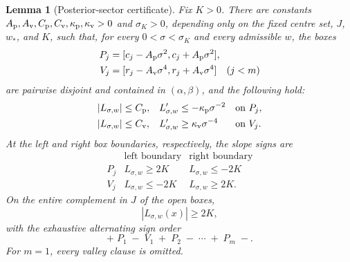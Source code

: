 \documentclass{iopjournal}
\theoremstyle{plain}
\newtheorem{lemma}[theorem]{Lemma}
\theoremstyle{definition}
\begin{document}
\begin{lemma}[Posterior-sector certificate]
\label{lem:exactmfull-posterior-sectors}
Fix \(K>0\).  There are constants
\(A_{\rm p},A_{\rm v},C_{\rm p},C_{\rm v},
\kappa_{\rm p},\kappa_{\rm v}>0\) and \(\sigma_K>0\), depending only on the
fixed centre set, \(J\), \(w_*\), and \(K\), such that, for every
\(0<\sigma<\sigma_K\) and every admissible \(w\), the boxes
\begin{align}
 P_j&=[c_j-A_{\rm p}\sigma^2,c_j+A_{\rm p}\sigma^2],
 \label{eq:exactmfull-peak-boxes}\\
 V_j&=[r_j-A_{\rm v}\sigma^4,r_j+A_{\rm v}\sigma^4]
 \quad(j<m)
 \label{eq:exactmfull-valley-boxes}
\end{align}
are pairwise disjoint and contained in \((\alpha,\beta)\), and the following
hold:
\begin{align}
 |L_{\sigma,w}|&\le C_{\rm p},&
 L_{\sigma,w}'&\le-\kappa_{\rm p}\sigma^{-2}
 &&\text{on }P_j,
 \label{eq:exactmfull-peak-box-control}\\
 |L_{\sigma,w}|&\le C_{\rm v},&
 L_{\sigma,w}'&\ge \kappa_{\rm v}\sigma^{-4}
 &&\text{on }V_j.
 \label{eq:exactmfull-valley-box-control}
\end{align}
At the left and right box boundaries, respectively, the slope signs are
\begin{equation}
 \begin{array}{c|cc}
 &\text{left boundary}&\text{right boundary}\\ \hline
 P_j&L_{\sigma,w}\ge2K&L_{\sigma,w}\le-2K\\
 V_j&L_{\sigma,w}\le-2K&L_{\sigma,w}\ge2K.
 \end{array}
 \label{eq:exactmfull-box-boundary-signs}
\end{equation}
On the entire complement in \(J\) of the open boxes,
\begin{equation}
 |L_{\sigma,w}(x)|\ge2K,
 \label{eq:exactmfull-complement-margin}
\end{equation}
with the exhaustive alternating sign order
\begin{equation}
 +\;P_1\;-\;V_1\;+\;P_2\;-\;\cdots\;+\;P_m\;-.
 \label{eq:exactmfull-complement-sign-order}
\end{equation}
For \(m=1\), every valley clause is omitted.
\end{lemma}
\end{document}
